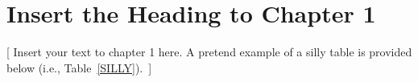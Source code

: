 \documentclass[12pt]{uthesis-v12}  %
\begin{document}

\chapter{Insert the Heading to Chapter 1}

[ Insert your text to chapter 1 here.  A pretend example of a silly
table is provided below (i.e., Table~\ref{SILLY}).~]

\end{document}
